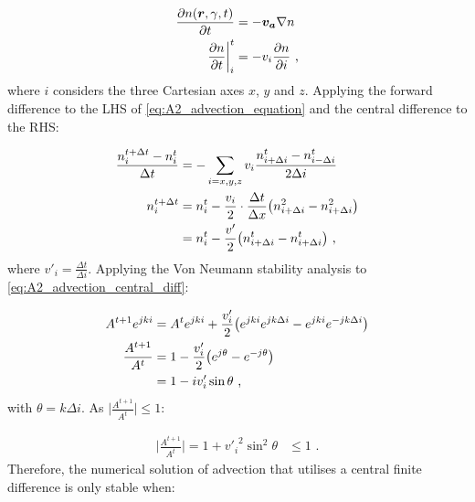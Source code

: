 \begin{equation}
    \begin{aligned}
    \pdv{n\qty(\boldsymbol{r},\gamma,t)}{t}&=-\boldsymbol{v_a}\nabla n  \\
    \pdv{n}{t}\bigg|_{i}^t&=-v_i\pdv{n}{i}\text{ ,} 
    \end{aligned} \label{eq:A2_advection_equation}
\end{equation}
\noindent where $i$ considers the three Cartesian axes $x$, $y$ and $z$. Applying the forward difference to the LHS of \autoref{eq:A2_advection_equation} and the central difference to the RHS:

\begin{equation}
    \begin{aligned}
    \frac{n^{t+\Delta t}_i-n^t_i}{\Delta t}&=-\sum_{i=x,y,z} v_i\frac{n_{i+\Delta i}^t-n_{i-\Delta i}^t}{2\Delta i} \\
    n_i^{t+\Delta t}&=n_i^t-\frac{v_i}{2}\cdot\frac{\Delta t}{\Delta x}\qty(n_{i+\Delta i}^2-n_{i+\Delta i}^2) \\
    &=n_i^t-\frac{v'}{2}\qty(n_{i+\Delta i}^t-n_{i+\Delta i}^t)\text{ ,} 
    \end{aligned} \label{eq:A2_advection_central_diff}
\end{equation}
\noindent where $v'_i=\frac{\Delta t}{\Delta i}$. Applying the Von Neumann stability analysis to \autoref{eq:A2_advection_central_diff}:

\begin{equation}
    \begin{aligned}
    A^{t+1}e^{jki}&=A^te^{jki}+\frac{v'_i}{2}\qty(e^{jki}e^{jk\Delta i}-e^{jki}e^{-jk\Delta i}) \\
    \frac{A^{t+1}}{A^t}&=1-\frac{v'_i}{2}\qty(e^{j\theta}-e^{-j\theta}) \\
    &=1-iv'_i\sin\theta\text{ ,} 
    \end{aligned}
\end{equation}
\noindent with $\theta=k\Delta i$. As $\lvert \frac{A^{t+1}}{A^t}\rvert\leq 1$:

\begin{equation}
    \begin{aligned}
        \bigg| \frac{A^{t+1}}{A^t}\bigg|=1+{v'_i}^2\sin^2\theta &\leq1\text{ .} 
    \end{aligned}
\end{equation}
\noindent Therefore, the numerical solution of advection that utilises a central finite difference is only stable when:

